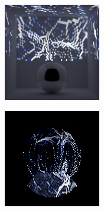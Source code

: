 \begin{figure}[]
\begin{subfigure}{\textwidth}
\begin{subfigure}{0.19\textwidth}
            \centering
            \includegraphics[width=\textwidth]{images/04-experiment03/ball/marble/stats_proj.jpg}
            \caption*{}
        \end{subfigure}
        \hfill
        \begin{subfigure}{0.19\textwidth}
            \centering
            \includegraphics[width=\textwidth]{images/04-experiment03/ball/marble/pixel_im.jpg}

\end{subfigure}
\end{subfigure}
\end{figure}
